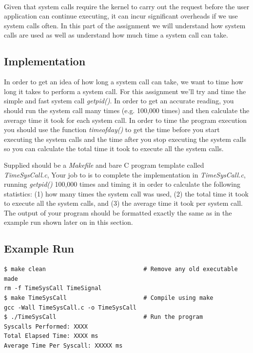 \documentclass{article}
\begin{document}
\-\ \\ Given that system calls require the kernel to carry out the request before the user application can continue executing, it can incur significant overheads if we use system calls often. In this part of the assignment we will understand how system calls are used as well as understand how much time a system call can take.
 
\subsection*{Implementation}
In order to get an idea of how long a system call can take, we want to time how long it takes to perform a system call. For this assignment we'll try and time the simple and fast system call \textit{getpid()}. In order to get an accurate reading, you should run the system call many times (e.g. 100,000 times) and then calculate the average time it took for each system call. In order to time the program execution you should use the function \textit{timeofday()} to get the time before you start executing the system calls and the time after you stop executing the system calls so you can calculate the total time it took to execute all the system calls. 

Supplied should be a \textit{Makefile} and bare C program template called \textit{TimeSysCall.c}, Your job to is to complete the implementation in \textit{TimeSysCall.c}, running \textit{getpid()} 100,000 times and timing it in order to calculate the following statistics: (1) how many times the system call was used, (2) the total time it took to execute all the system calls, and (3) the average time it took per system call. The output of your program should be formatted exactly the same as in the example run shown later on in this section. 

\subsection*{Example Run}
\begin{commandline}
	\begin{verbatim}
$ make clean                            # Remove any old executable made
rm -f TimeSysCall TimeSignal
$ make TimeSysCall                      # Compile using make
gcc -Wall TimeSysCall.c -o TimeSysCall
$ ./TimeSysCall                         # Run the program
Syscalls Performed: XXXX
Total Elapsed Time: XXXX ms
Average Time Per Syscall: XXXXX ms
	\end{verbatim}
\end{commandline}
\end{document}

